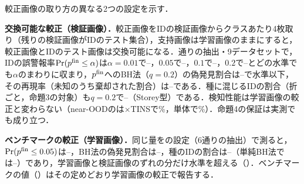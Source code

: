 較正画像の取り方の異なる2つの設定を示す．

\textbf{交換可能な較正（検証画像）．}較正画像をIDの検証画像からクラスあたり4枚取り（残りの検証画像がIDのテスト集合），支持画像は学習画像のままにすると，較正画像とIDのテスト画像は交換可能になる．\NVcalNSplits{}通りの抽出・9データセットで，IDの誤警報率$\Pr(p^{\mathrm{fin}}\le\alpha)$は$\alpha{=}0.01$で\NVcalFprZeroZeroOneMin{}--\NVcalFprZeroZeroOneMax{}，$0.05$で\NVcalFprZeroZeroFiveMin{}--\NVcalFprZeroZeroFiveMax{}，$0.1$で\NVcalFprZeroOneMin{}--\NVcalFprZeroOneMax{}，$0.2$で\NVcalFprZeroTwoMin{}--\NVcalFprZeroTwoMax{}とどの水準でも$\alpha$のまわりに収まり，$p^{\mathrm{fin}}$へのBH法（$q{=}0.2$）の偽発見割合は\NVcalBhFdpMin{}--\NVcalBhFdpMax{}で水準以下，その再現率（未知のうち棄却された割合）は\NVcalBhRecallMin{}--\NVcalBhRecallMax{}である．種に混じるIDの割合（折ごと，命題3の対象）も$q{=}0.2$で\NVcalIdfracStoreyMin{}--\NVcalIdfracStoreyMax{}（Storey型）である．検知性能は学習画像の較正と変わらない（near-OODの\FPR{}は$\times$TINSで\NVcalMainNearFpr\%，単体で\NVcalAloneNearFpr\%）．命題4の保証は実測でも成り立つ．

\textbf{ベンチマークの較正（学習画像）．}同じ量をの設定（6通りの抽出）で測ると，$\Pr(p^{\mathrm{fin}}\le0.05)$は\NVtrainFprZeroZeroFiveMin{}--\NVtrainFprZeroZeroFiveMax{}，BH法の偽発見割合は\NVtrainBhFdpMin{}--\NVtrainBhFdpMax{}，種のIDの割合は\NVtrainIdfracStoreyMin{}--\NVtrainIdfracStoreyMax{}（単純BH法では\NVtrainIdfracBhMin{}--\NVtrainIdfracBhMax{}）であり，学習画像と検証画像のずれの分だけ水準を超える（）．ベンチマークの値（）はその定めどおり学習画像の較正で報告する．
